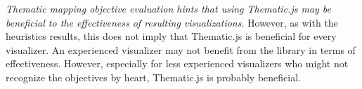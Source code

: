 \emph{Thematic mapping objective evaluation hints that using Thematic.js may be beneficial to the effectiveness of resulting visualizations}. However, as with the heuristics results, this does not imply that Thematic.js is beneficial for every visualizer. An experienced visualizer may not benefit from the library in terms of effectiveness. However, especially for less experienced visualizers who might not recognize the objectives by heart, Thematic.js is probably beneficial.
